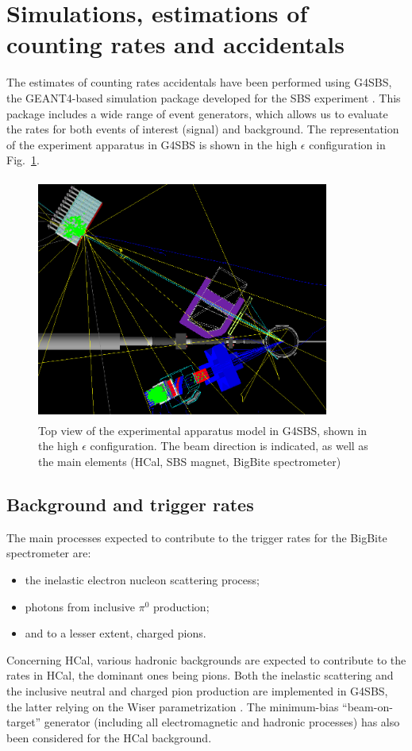 
\section{Simulations, estimations of counting rates and accidentals}\label{sec:simu}

The estimates of counting rates accidentals have been performed using G4SBS, the GEANT4-based simulation package developed for the SBS experiment \cite{g4sbs}.
This package includes a wide range of event generators, which allows us to evaluate the rates for both events of interest (signal) and background.
The representation of the experiment apparatus in G4SBS is shown in the high $\epsilon$ configuration in Fig.~\ref{fig:g4sbssetup}. 

\begin{figure}[!h]
  \centering
    \includegraphics[width=9.6cm,height=8cm]{Plots/SetupHiEPoint.png}
    \caption{Top view of the experimental apparatus model in G4SBS, shown in the high $\epsilon$ configuration. The beam direction is indicated, as well as the main elements (HCal, SBS magnet, BigBite spectrometer)}
    \label{fig:g4sbssetup}
\end{figure}

\subsection{Background and trigger rates}
The main processes expected to contribute to the trigger rates for the BigBite spectrometer are:
%
\begin{itemize}
\item{the inelastic electron nucleon scattering process;}
\item{photons from inclusive $\pi^0$ production;}
\item{and to a lesser extent, charged pions.}
\end{itemize}
%
Concerning HCal, various hadronic backgrounds are expected to contribute to the rates in HCal, the dominant ones being pions.
Both the inelastic scattering and the inclusive neutral and charged pion production are implemented in G4SBS, the latter relying on the Wiser parametrization \cite{wiser}.
The minimum-bias ``beam-on-target'' generator (including all electromagnetic and hadronic processes) has also been considered for the HCal background.

